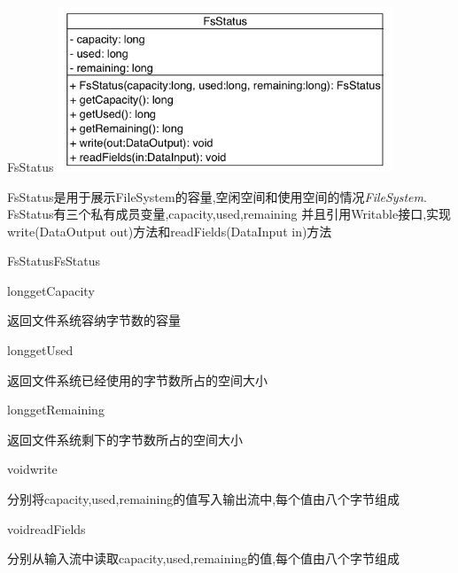 \begin{XeClass}{FsStatus}
\includegraphics[width=10cm]{cdig/FsStatus.png}
     
 FsStatus是用于展示FileSystem的容量,空闲空间和使用空间的情况\emph{FileSystem}.
 FsStatus有三个私有成员变量,capacity,used,remaining
 并且引用Writable接口,实现write(DataOutput out)方法和readFields(DataInput in)方法

    \begin{XeMethod}{\XePublic}{FsStatus}{FsStatus}
         

    \end{XeMethod}

    \begin{XeMethod}{\XePublic}{long}{getCapacity}
         
 返回文件系统容纳字节数的容量

    \end{XeMethod}

    \begin{XeMethod}{\XePublic}{long}{getUsed}
         
 返回文件系统已经使用的字节数所占的空间大小

    \end{XeMethod}

    \begin{XeMethod}{\XePublic}{long}{getRemaining}
         
 返回文件系统剩下的字节数所占的空间大小

    \end{XeMethod}

    \begin{XeMethod}{\XePublic}{void}{write}
         
 分别将capacity,used,remaining的值写入输出流中,每个值由八个字节组成

    \end{XeMethod}

    \begin{XeMethod}{\XePublic}{void}{readFields}
         
 分别从输入流中读取capacity,used,remaining的值,每个值由八个字节组成

    \end{XeMethod}

\end{XeClass}
